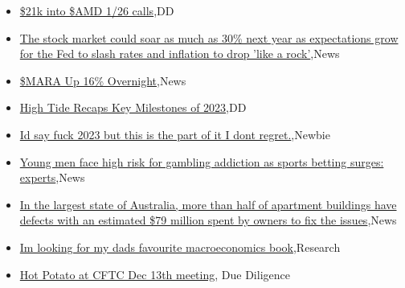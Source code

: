 \documentclass{article}%
\begin{document}
%
\begin{itemize}%
\item%
\href{https://reddit.com/r/wallstreetbets/comments/18wkova/21k\_into\_amd\_126\_calls/}{\$21k into \$AMD 1/26 calls},DD%
\item%
\href{https://reddit.com/r/wallstreetbets/comments/18wibdm/the\_stock\_market\_could\_soar\_as\_much\_as\_30\_next/}{The stock market could soar as much as 30\% next year as expectations grow for the Fed to slash rates and inflation to drop 'like a rock'},News%
\item%
\href{https://reddit.com/r/wallstreetbets/comments/18wi6qc/mara\_up\_16\_overnight/}{\$MARA Up 16\% Overnight},News%
\item%
\href{https://reddit.com/r/Baystreetbets/comments/18vxg47/high\_tide\_recaps\_key\_milestones\_of\_2023/}{High Tide Recaps Key Milestones of 2023},DD%
\item%
\href{https://reddit.com/r/StockMarket/comments/18wadnc/id\_say\_fuck\_2023\_but\_this\_is\_the\_part\_of\_it\_i/}{Id say fuck 2023 but this is the part of it I dont regret.},Newbie%
\item%
\href{https://reddit.com/r/Economics/comments/18w5o3x/young\_men\_face\_high\_risk\_for\_gambling\_addiction/}{Young men face high risk for gambling addiction as sports betting surges: experts},News%
\item%
\href{https://reddit.com/r/Economics/comments/18w3h25/in\_the\_largest\_state\_of\_australia\_more\_than\_half/}{In the largest state of Australia, more than half of apartment buildings have defects  with an estimated \$79 million spent by owners to fix the issues},News%
\item%
\href{https://reddit.com/r/Economics/comments/18w28a7/im\_looking\_for\_my\_dads\_favourite\_macroeconomics/}{Im looking for my dads favourite macroeconomics book},Research%
\item%
\href{https://reddit.com/r/Superstonk/comments/18wiw86/hot\_potato\_at\_cftc\_dec\_13th\_meeting/}{Hot Potato at CFTC Dec 13th meeting}, Due Diligence%
\end{itemize}%
\end{document}
